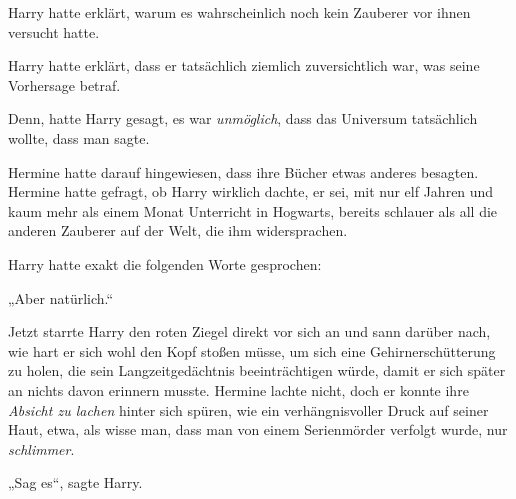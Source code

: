 Harry hatte erklärt, warum es wahrscheinlich noch kein Zauberer vor ihnen versucht hatte.

Harry hatte erklärt, dass er tatsächlich ziemlich zuversichtlich war, was seine Vorhersage betraf.

Denn, hatte Harry gesagt, es war \emph{unmöglich}, dass das Universum tatsächlich wollte, dass man  sagte.

Hermine hatte darauf hingewiesen, dass ihre Bücher etwas anderes besagten. Hermine hatte gefragt, ob Harry wirklich dachte, er sei, mit nur elf Jahren und kaum mehr als einem Monat Unterricht in Hogwarts, bereits schlauer als all die anderen Zauberer auf der Welt, die ihm widersprachen.

Harry hatte exakt die folgenden Worte gesprochen:

„Aber natürlich.“

Jetzt starrte Harry den roten Ziegel direkt vor sich an und sann darüber nach, wie hart er sich wohl den Kopf stoßen müsse, um sich eine Gehirnerschütterung zu holen, die sein Langzeitgedächtnis beeinträchtigen würde, damit er sich später an nichts davon erinnern musste. Hermine lachte nicht, doch er konnte ihre \emph{Absicht zu lachen} hinter sich spüren, wie ein verhängnisvoller Druck auf seiner Haut, etwa, als wisse man, dass man von einem Serienmörder verfolgt wurde, nur \emph{schlimmer}.

„Sag es“, sagte Harry.

